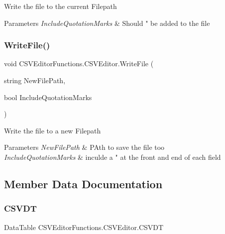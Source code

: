 Write the file to the current Filepath 


\begin{DoxyParams}{Parameters}
{\em Include\+Quotation\+Marks} & Should " be added to the file\\
\hline
\end{DoxyParams}
\mbox{\label{class_c_s_v_editor_functions_1_1_c_s_v_editor_a5751e40d1d16cf755c0e828fc53614dd}} 
\subsubsection{\texorpdfstring{WriteFile()}{WriteFile()}\hspace{0.1cm}{\footnotesize\ttfamily [2/2]}}
{\footnotesize\ttfamily void C\+S\+V\+Editor\+Functions.\+C\+S\+V\+Editor.\+Write\+File (\begin{DoxyParamCaption}\item[{string}]{New\+File\+Path,  }\item[{bool}]{Include\+Quotation\+Marks }\end{DoxyParamCaption})}



Write the file to a new Filepath 


\begin{DoxyParams}{Parameters}
{\em New\+File\+Path} & P\+Ath to save the file too\\
\hline
{\em Include\+Quotation\+Marks} & inculde a " at the front and end of each field\\
\hline
\end{DoxyParams}


\subsection{Member Data Documentation}
\mbox{\label{class_c_s_v_editor_functions_1_1_c_s_v_editor_a275aa6ff33508d362d66b13e79bbd4ba}} 
\subsubsection{\texorpdfstring{CSVDT}{CSVDT}}
{\footnotesize\ttfamily Data\+Table C\+S\+V\+Editor\+Functions.\+C\+S\+V\+Editor.\+C\+S\+V\+DT}



